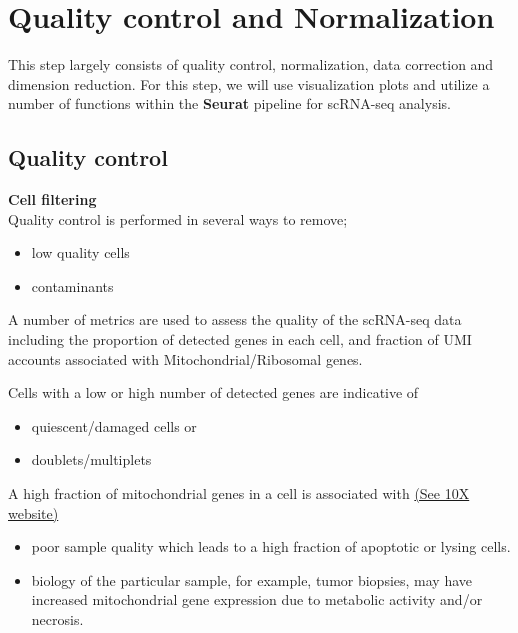 \documentclass[
]{book}
\providecommand{\tightlist}{%
  \setlength{\itemsep}{0pt}\setlength{\parskip}{0pt}}
\begin{document}
\hypertarget{quality-control-and-normalization}{%
\section{Quality control and Normalization}\label{quality-control-and-normalization}}

This step largely consists of quality control, normalization, data correction and dimension reduction. For this step, we will use visualization plots and utilize a number of functions within the \textbf{Seurat} \citep{hao2021} pipeline for scRNA-seq analysis.

\hypertarget{quality-control}{%
\subsection{Quality control}\label{quality-control}}

\textbf{Cell filtering}\\

Quality control is performed in several ways to remove;

\begin{itemize}
\tightlist
\item
  low quality cells
\item
  contaminants
\end{itemize}

A number of metrics are used to assess the quality of the scRNA-seq data including the proportion of detected genes in each cell, and fraction of UMI accounts associated with Mitochondrial/Ribosomal genes.

Cells with a low or high number of detected genes are indicative of

\begin{itemize}
\tightlist
\item
  quiescent/damaged cells or
\item
  doublets/multiplets \citep{nayak2021hitchhiker}
\end{itemize}

A high fraction of mitochondrial genes in a cell is associated with \href{https://kb.10xgenomics.com/hc/en-us/articles/360001086611-Why-do-I-see-a-high-level-of-mitochondrial-gene-expression-}{(See 10X website)}

\begin{itemize}
\tightlist
\item
  poor sample quality which leads to a high fraction of apoptotic or lysing cells.
\item
  biology of the particular sample, for example, tumor biopsies, may have increased mitochondrial gene expression due to metabolic activity and/or necrosis.
\end{itemize}
\end{document}
